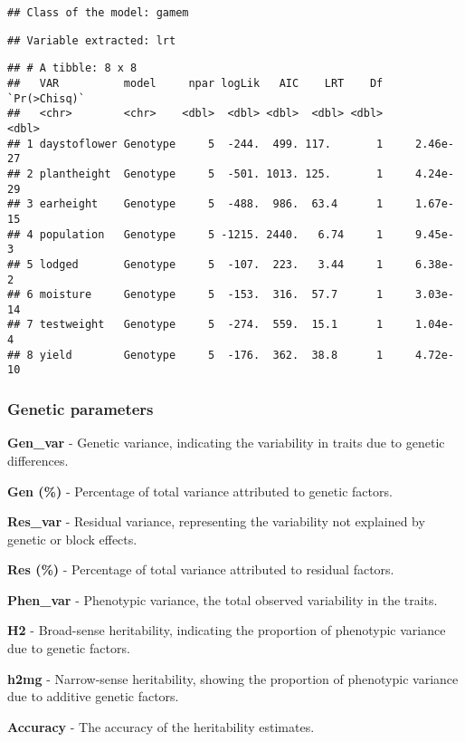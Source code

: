 \documentclass[
]{article}
\begin{document}
\begin{verbatim}
## Class of the model: gamem
\end{verbatim}

\begin{verbatim}
## Variable extracted: lrt
\end{verbatim}

\begin{verbatim}
## # A tibble: 8 x 8
##   VAR          model     npar logLik   AIC    LRT    Df `Pr(>Chisq)`
##   <chr>        <chr>    <dbl>  <dbl> <dbl>  <dbl> <dbl>        <dbl>
## 1 daystoflower Genotype     5  -244.  499. 117.       1     2.46e-27
## 2 plantheight  Genotype     5  -501. 1013. 125.       1     4.24e-29
## 3 earheight    Genotype     5  -488.  986.  63.4      1     1.67e-15
## 4 population   Genotype     5 -1215. 2440.   6.74     1     9.45e- 3
## 5 lodged       Genotype     5  -107.  223.   3.44     1     6.38e- 2
## 6 moisture     Genotype     5  -153.  316.  57.7      1     3.03e-14
## 7 testweight   Genotype     5  -274.  559.  15.1      1     1.04e- 4
## 8 yield        Genotype     5  -176.  362.  38.8      1     4.72e-10
\end{verbatim}

\subsubsection{Genetic parameters}\label{genetic-parameters}

\textbf{Gen\_var} - Genetic variance, indicating the variability in
traits due to genetic differences.

\textbf{Gen (\%)} - Percentage of total variance attributed to genetic
factors.

\textbf{Res\_var} - Residual variance, representing the variability not
explained by genetic or block effects.

\textbf{Res (\%)} - Percentage of total variance attributed to residual
factors.

\textbf{Phen\_var} - Phenotypic variance, the total observed variability
in the traits.

\textbf{H2} - Broad-sense heritability, indicating the proportion of
phenotypic variance due to genetic factors.

\textbf{h2mg} - Narrow-sense heritability, showing the proportion of
phenotypic variance due to additive genetic factors.

\textbf{Accuracy} - The accuracy of the heritability estimates.
\end{document}
